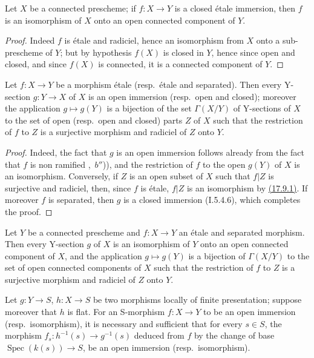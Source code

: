 \begin{corollary}[17.9.2]
\label{IV.17.9.2}
Let $X$ be a connected prescheme; if $f:X\to Y$ is a closed \'etale immersion, then $f$ is an isomorphism of $X$ onto an open connected component of $Y$.
\end{corollary}

\begin{proof}
Indeed $f$ is \'etale and radiciel, hence an isomorphism from $X$ onto a sub-prescheme of $Y$; but by hypothesis $f(X)$ is closed in $Y$, hence since open and closed, and since $f(X)$ is connected, it is a connected component of $Y$.
\end{proof}

\begin{corollary}[17.9.3]
\label{IV.17.9.3}
Let $f:X\to Y$ be a morphism \'etale (resp.\ \'etale and separated).
Then every Y-section $g:Y\to X$ of $X$ is an open immersion (resp.\ open and closed); moreover the application $g\mapsto g(Y)$ is a bijection of the set $\Gamma(X/Y)$ of Y-sections of $X$ to the set of open (resp.\ open and closed) parts $Z$ of $X$ such that the restriction of $f$ to $Z$ is a surjective morphism and radiciel of $Z$ onto $Y$.
\end{corollary}

\begin{proof}
Indeed, the fact that $g$ is an open immersion follows already from the fact that $f$ is non ramified ,~$b''$)), and the restriction of $f$ to the open $g(Y)$ of $X$ is an isomorphism.
Conversely, if $Z$ is an open subset of $X$ such that $f|Z$ is surjective and radiciel, then, since $f$ is \'etale, $f|Z$ is an isomorphism by {\hyperlink{ega4.c04.thm.17-9-1}{(17.9.1)}}.
If moreover $f$ is separated, then $g$ is a closed immersion (I.5.4.6), which completes the proof.
\end{proof}

\begin{corollary}[17.9.4]
\label{IV.17.9.4}
Let $Y$ be a connected prescheme and $f:X\to Y$ an \'etale and separated morphism.
Then every Y-section $g$ of $X$ is an isomorphism of $Y$ onto an open connected component of $X$, and the application $g\mapsto g(Y)$ is a bijection of $\Gamma(X/Y)$ to the set of open connected components of $X$ such that the restriction of $f$ to $Z$ is a surjective morphism and radiciel of $Z$ onto $Y$.
\end{corollary}

\begin{corollary}[17.9.5]
\label{IV.17.9.5}
Let $g:Y\to S$, $h:X\to S$ be two morphisms locally of finite presentation; suppose moreover that $h$ is flat.
For an S-morphism $f:X\to Y$ to be an open immersion (resp.\ isomorphism), it is necessary and sufficient that for every $s\in S$, the morphism $f_s:h^{-1}(s)\to g^{-1}(s)$ deduced from $f$ by the change of base $\operatorname{Spec}(k(s))\to S$, be an open immersion (resp.\ isomorphism).
\end{corollary}

